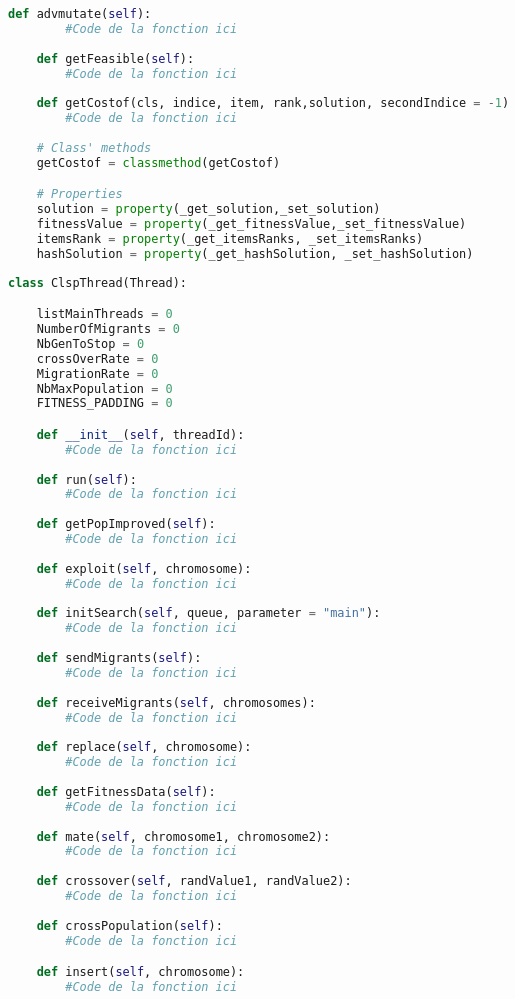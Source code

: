 \begin{lstlisting}[language=python]
	def advmutate(self):
		#Code de la fonction ici
	
	def getFeasible(self):
		#Code de la fonction ici
	
	def getCostof(cls, indice, item, rank,solution, secondIndice = -1):
		#Code de la fonction ici
	
	# Class' methods
	getCostof = classmethod(getCostof)

	# Properties
	solution = property(_get_solution,_set_solution)
	fitnessValue = property(_get_fitnessValue,_set_fitnessValue)
	itemsRank = property(_get_itemsRanks, _set_itemsRanks)
	hashSolution = property(_get_hashSolution, _set_hashSolution) 

    \end{lstlisting}
    
    \begin{lstlisting}[language=python]
class ClspThread(Thread):

	listMainThreads = 0
	NumberOfMigrants = 0
	NbGenToStop = 0
	crossOverRate = 0
	MigrationRate = 0
	NbMaxPopulation = 0
	FITNESS_PADDING = 0

	def __init__(self, threadId):
		#Code de la fonction ici	
	
	def run(self):
		#Code de la fonction ici	
	
	def getPopImproved(self):
		#Code de la fonction ici	
	
	def exploit(self, chromosome):
		#Code de la fonction ici	
	
	def initSearch(self, queue, parameter = "main"):
		#Code de la fonction ici	
	
	def sendMigrants(self):
		#Code de la fonction ici	
	
	def receiveMigrants(self, chromosomes):
		#Code de la fonction ici	
	
	def replace(self, chromosome):
		#Code de la fonction ici	
	
	def getFitnessData(self):
		#Code de la fonction ici	
	
	def mate(self, chromosome1, chromosome2):
		#Code de la fonction ici	
	
	def crossover(self, randValue1, randValue2):
		#Code de la fonction ici
	
	def crossPopulation(self):
		#Code de la fonction ici	

	def insert(self, chromosome):
		#Code de la fonction ici		
		
    \end{lstlisting}
    
